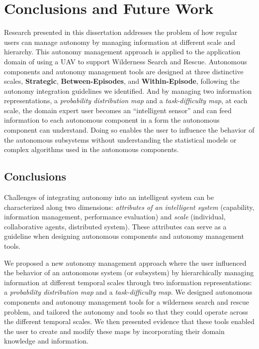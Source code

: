 \chapter[Conclusions and Future Work]{Conclusions and Future Work}
\label{chap:Conclusions}

Research presented in this dissertation addresses the problem of how regular users can manage autonomy by managing information at different scale and hierarchy. This autonomy management approach is applied to the application domain of using a UAV to support Wilderness Search and Rescue. Autonomous components and autonomy management tools are designed at three distinctive scales, \textbf{Strategic}, \textbf{Between-Episodes}, and \textbf{Within-Episode}, following the autonomy integration guidelines we identified. And by managing two information representations, a \textit{probability distribution map} and a \textit{task-difficulty map}, at each scale, the domain expert user becomes an ``intelligent sensor'' and can feed information to each autonomous component in a form the autonomous component can understand. Doing so enables the user to influence the behavior of the autonomous subsystems without understanding the statistical models or complex algorithms used in the autonomous components.

\section{Conclusions}
\label{conclusions}

Challenges of integrating autonomy into an intelligent system can be characterized along two dimensions: \textit{attributes of an intelligent system} (capability, information management, performance evaluation) and \textit{scale} (individual, collaborative agents, distributed system). These attributes can serve as a guideline when designing autonomous components and autonomy management tools. 

We proposed a new autonomy management approach where the user influenced the behavior of an autonomous system (or subsystem) by hierarchically managing information at different temporal scales through two information representations:  a \textit{probability distribution map} and a \textit{task-difficulty map}. We designed autonomous components and autonomy management tools for a wilderness search and rescue problem, and tailored the autonomy and tools so that they could operate across the different temporal scales.  We then presented evidence that these tools enabled the user to create and modify these maps by incorporating their domain knowledge and information. 

